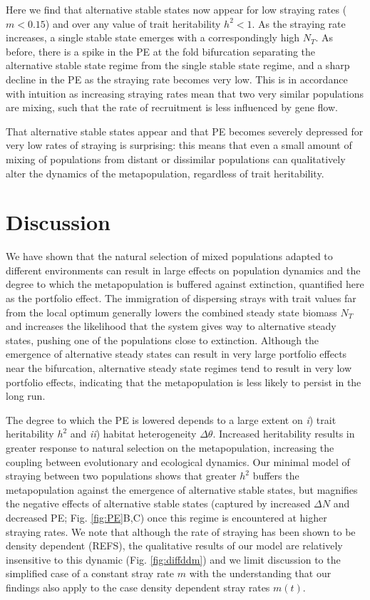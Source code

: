 \documentclass[twocolumn,preprintnumbers,amsmath,amssymb,superscriptaddress]{revtex4}
\begin{document}
Here we find that alternative stable states now appear for low straying rates ($m<0.15$) and over any value of trait heritability $h^2<1$.
As the straying rate increases, a single stable state emerges with a correspondingly high $N_T$.
As before, there is a spike in the PE at the fold bifurcation separating the alternative stable state regime from the single stable state regime, and a sharp decline in the PE as the straying rate becomes very low.
This is in accordance with intuition as increasing straying rates mean that two very similar populations are mixing, such that the rate of recruitment is less influenced by gene flow.

That alternative stable states appear and that PE becomes severely depressed for very low rates of straying is surprising: this means that even a small amount of mixing of populations from distant or dissimilar populations can qualitatively alter the dynamics of the metapopulation, regardless of trait heritability.


\section{Discussion}

We have shown that the natural selection of mixed populations adapted to different environments can result in large effects on population dynamics and the degree to which the metapopulation is buffered against extinction, quantified here as the portfolio effect.
The immigration of dispersing strays with trait values far from the local optimum generally lowers the combined steady state biomass $N_T$ and increases the likelihood that the system gives way to alternative steady states, pushing one of the populations close to extinction.
Although the emergence of alternative steady states can result in very large portfolio effects near the bifurcation, alternative steady state regimes tend to result in very low portfolio effects, indicating that the metapopulation is less likely to persist in the long run.

The degree to which the PE is lowered depends to a large extent on \emph{i}) trait heritability $h^2$ and \emph{ii}) habitat heterogeneity $\Delta \theta$.
Increased heritability results in greater response to natural selection on the metapopulation, increasing the coupling between evolutionary and ecological dynamics. 
Our minimal model of straying between two populations shows that greater $h^2$ buffers the metapopulation against the emergence of alternative stable states, but magnifies the negative effects of alternative stable states (captured by increased $\Delta N$ and decreased PE; Fig. \ref{fig:PE}B,C) once this regime is encountered at higher straying rates.
We note that although the rate of straying has been shown to be density dependent (REFS), the qualitative results of our model are relatively insensitive to this dynamic (Fig. \ref{fig:diffddm}) and we limit discussion to the simplified case of a constant stray rate $m$ with the understanding that our findings also apply to the case density dependent stray rates $m(t)$.
\end{document}
